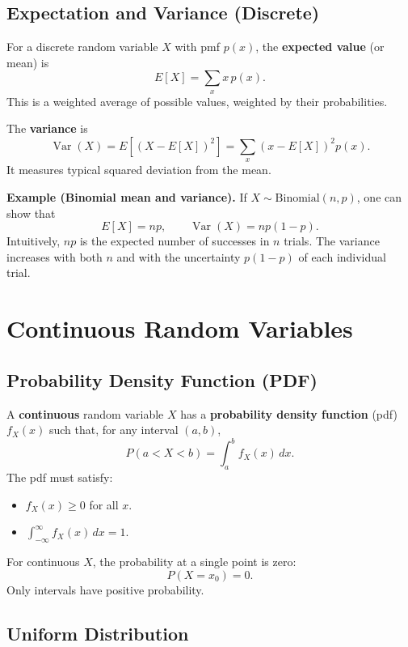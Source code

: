 \documentclass[11pt,a4paper]{article}
\begin{document}
\subsection{Expectation and Variance (Discrete)}

For a discrete random variable \(X\) with pmf \(p(x)\), the \textbf{expected value} (or mean) is
\[
E[X] = \sum_{x} x \, p(x).
\]
This is a weighted average of possible values, weighted by their probabilities.

The \textbf{variance} is
\[
\operatorname{Var}(X) = E[(X - E[X])^2]
= \sum_{x} (x - E[X])^2 p(x).
\]
It measures typical squared deviation from the mean.

\textbf{Example (Binomial mean and variance).}  
If \(X \sim \text{Binomial}(n,p)\), one can show that
\[
E[X] = np,\qquad \operatorname{Var}(X) = np(1-p).
\]
Intuitively, \(np\) is the expected number of successes in \(n\) trials.  
The variance increases with both \(n\) and with the uncertainty \(p(1-p)\) of each individual trial.

\newpage

\section{Continuous Random Variables}

\subsection{Probability Density Function (PDF)}

A \textbf{continuous} random variable \(X\) has a \textbf{probability density function} (pdf) \(f_X(x)\) such that, for any interval \((a,b)\),
\[
P(a < X < b) = \int_{a}^{b} f_X(x)\,dx.
\]
The pdf must satisfy:
\begin{itemize}
    \item \(f_X(x) \ge 0\) for all \(x\).
    \item \(\displaystyle \int_{-\infty}^{\infty} f_X(x)\,dx = 1\).
\end{itemize}

For continuous \(X\), the probability at a single point is zero:
\[
P(X = x_0) = 0.
\]
Only intervals have positive probability.

\subsection{Uniform Distribution}
\end{document}
